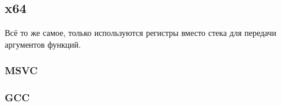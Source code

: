 \subsection{x64}

Всё то же самое, только используются регистры вместо стека для передачи аргументов функций.

\subsubsection{MSVC}



\subsubsection{GCC}


